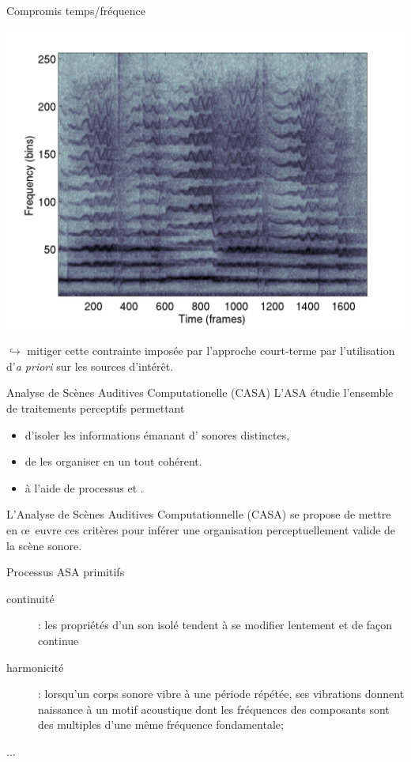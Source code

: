 \begin{frame}{Compromis temps/fréquence}
\begin{center}
\includegraphics[width=.7\columnwidth]{figures/soloSpec} 
\end{center}
	$\hookrightarrow{}$ mitiger cette contrainte imposée par l'approche court-terme par l'utilisation d'\alert{\textit{a priori}} sur les sources d'intérêt.
\end{frame}

\begin{frame}{Analyse de Scènes Auditives Computationelle (CASA)}
L'ASA étudie l'ensemble de traitements perceptifs permettant
\begin{itemize}
\item d'isoler les informations émanant d' sonores distinctes,
\item de les organiser en un tout cohérent.
\item à l'aide de processus  et .
\end{itemize}
L'Analyse de Scènes Auditives Computationnelle (CASA) se propose de mettre en \oe~euvre ces critères pour inférer une organisation perceptuellement valide de la scène sonore.
\end{frame}

\begin{frame}{Processus ASA \og primitifs \fg}
\begin{description}
\item[\alert<2>{continuité}] : les propriétés d'un son isolé tendent à se modifier lentement et de façon continue
\item[harmonicité] : lorsqu'un corps sonore vibre à une période répétée, ses vibrations donnent naissance à un motif acoustique dont les fréquences des composants sont des multiples d'une même fréquence fondamentale;
\item[...]
\end{description}
\end{frame}

